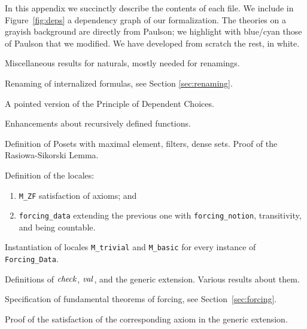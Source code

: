 In this appendix we succinctly describe the contents of each file. We
include in 
Figure~\ref{fig:deps}  a dependency graph of our formalization. The
theories on a grayish background are directly from Paulson; we
highlight with blue/cyan those of Paulson that we modified. We
have developed from scratch the rest, in white.

\begin{description}[itemsep=1.5pt]
\item[\texttt{Nat\_Miscellanea}]Miscellaneous results for naturals, mostly
  needed for renamings.
\item[\texttt{Renaming}] Renaming of internalized formulas, see
  Section \ref{sec:renaming}.
\item[\texttt{Pointed\_DC}] A pointed version of the Principle of
  Dependent Choices.
\item[\texttt{Recursion\_Thms}] Enhancements about recursively defined
  functions.
\item[\texttt{Forcing\_Notions}] Definition of Posets with maximal
  element, filters, dense sets. Proof of the Rasiowa-Sikorski Lemma.
\item[\texttt{Forcing\_Data}] Definition of the locales:
  \begin{enumerate}
  \item \texttt{M\_ZF} satisfaction of axioms; and 
  \item \texttt{forcing\_data} extending the previous one with
    \texttt{forcing\_notion}, transitivity, and being countable.
  \end{enumerate}
\item[\texttt{Interface}] Instantiation of locales \texttt{M\_trivial}
  and \texttt{M\_basic} for every instance of \texttt{Forcing\_Data}.
\item[\texttt{Names}] Definitions of $\operatorname{\mathit{check}}$, $\operatorname{\mathit{val}}$, and the generic
  extension. Various results about them.
\item[\texttt{Forcing\_Theorems}] Specification of fundamental
  theorems of forcing, see Section~\ref{sec:forcing}.
\item[\texttt{*\_Axiom}] Proof of the satisfaction of the
  corresponding axiom in the generic extension.
\end{description}
%
